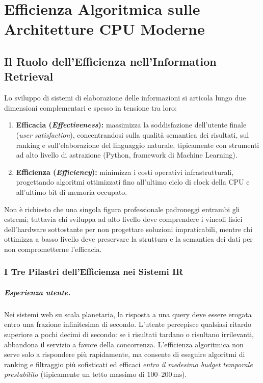\chapter{Efficienza Algoritmica sulle Architetture CPU Moderne}
\label{chap:efficienza-cpu}

\FloatBarrier
\section{Il Ruolo dell'Efficienza nell'Information Retrieval}

Lo sviluppo di sistemi di elaborazione delle informazioni si articola lungo due dimensioni complementari e spesso in tensione tra loro:

\begin{enumerate}
    \item \textbf{Efficacia (\textit{Effectiveness}):} massimizza la soddisfazione dell'utente finale (\textit{user satisfaction}), concentrandosi sulla qualit\`a semantica dei risultati, sul ranking e sull'elaborazione del linguaggio naturale, tipicamente con strumenti ad alto livello di astrazione (Python, framework di Machine Learning).
    \item \textbf{Efficienza (\textit{Efficiency}):} minimizza i costi operativi infrastrutturali, progettando algoritmi ottimizzati fino all'ultimo ciclo di clock della CPU e all'ultimo bit di memoria occupato.
\end{enumerate}

Non \`e richiesto che una singola figura professionale padroneggi entrambi gli estremi; tuttavia chi sviluppa ad alto livello deve comprendere i vincoli fisici dell'hardware sottostante per non progettare soluzioni impraticabili, mentre chi ottimizza a basso livello deve preservare la struttura e la semantica dei dati per non comprometterne l'efficacia.

\subsection{I Tre Pilastri dell'Efficienza nei Sistemi IR}

\paragraph{Esperienza utente.} Nei sistemi web su scala planetaria, la risposta a una query deve essere erogata entro una frazione infinitesima di secondo. L'utente percepisce qualsiasi ritardo superiore a pochi decimi di secondo: se i risultati tardano o risultano irrilevanti, abbandona il servizio a favore della concorrenza. L'efficienza algoritmica non serve solo a rispondere pi\`u rapidamente, ma consente di eseguire algoritmi di ranking e filtraggio pi\`u sofisticati ed efficaci \emph{entro il medesimo budget temporale prestabilito} (tipicamente un tetto massimo di $100$--$200\,\text{ms}$).

